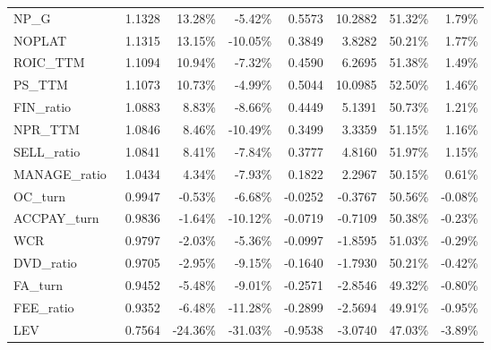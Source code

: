\documentclass[11pt]{article}
\begin{document}
\begin{table}[htbp]
\begin{tabular}{lrrrrrrr}
    NP\_G\ & 1.1328  & 13.28\% & -5.42\% & 0.5573  & 10.2882  & 51.32\% & 1.79\% \\
    NOPLAT\ & 1.1315  & 13.15\% & -10.05\% & 0.3849  & 3.8282  & 50.21\% & 1.77\% \\
    ROIC\_TTM\ & 1.1094  & 10.94\% & -7.32\% & 0.4590  & 6.2695  & 51.38\% & 1.49\% \\
    PS\_TTM\ & 1.1073  & 10.73\% & -4.99\% & 0.5044  & 10.0985  & 52.50\% & 1.46\% \\
    FIN\_ratio\ & 1.0883  & 8.83\% & -8.66\% & 0.4449  & 5.1391  & 50.73\% & 1.21\% \\
    NPR\_TTM\ & 1.0846  & 8.46\% & -10.49\% & 0.3499  & 3.3359  & 51.15\% & 1.16\% \\
    SELL\_ratio\ & 1.0841  & 8.41\% & -7.84\% & 0.3777  & 4.8160  & 51.97\% & 1.15\% \\
    MANAGE\_ratio\ & 1.0434  & 4.34\% & -7.93\% & 0.1822  & 2.2967  & 50.15\% & 0.61\% \\
    OC\_turn\ & 0.9947  & -0.53\% & -6.68\% & -0.0252  & -0.3767  & 50.56\% & -0.08\% \\
    ACCPAY\_turn\ & 0.9836  & -1.64\% & -10.12\% & -0.0719  & -0.7109  & 50.38\% & -0.23\% \\
    WCR\ & 0.9797  & -2.03\% & -5.36\% & -0.0997  & -1.8595  & 51.03\% & -0.29\% \\
    DVD\_ratio\ & 0.9705  & -2.95\% & -9.15\% & -0.1640  & -1.7930  & 50.21\% & -0.42\% \\
    FA\_turn\ & 0.9452  & -5.48\% & -9.01\% & -0.2571  & -2.8546  & 49.32\% & -0.80\% \\
    FEE\_ratio\ & 0.9352  & -6.48\% & -11.28\% & -0.2899  & -2.5694  & 49.91\% & -0.95\% \\
    LEV\ & 0.7564  & -24.36\% & -31.03\% & -0.9538  & -3.0740  & 47.03\% & -3.89\% \\
    \bottomrule
    \end{tabular}%
  \label{tab:resid}%
\end{table}%


\nocite{*}

\end{document}
